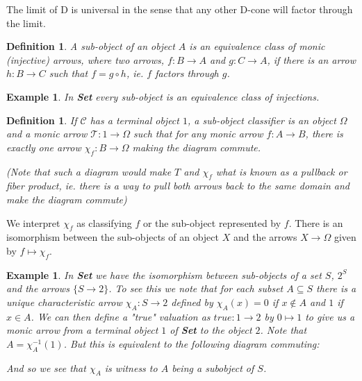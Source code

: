 \documentclass[12pt,a4paper]{article}
\newtheorem{example}[theorem]{Example}
\newtheorem{definition}[theorem]{Definition}
\newcommand\CC{\mathcal{C}}
\newcommand\TT{\mathcal{T}}
\begin{document}
The limit of D is universal in the sense that any other D-cone will factor through the limit.

\begin{definition}
    A \textit{sub-object} of an object $A$ is an equivalence class of monic (injective) arrows, where two arrows, $f:B\to A$ and $g:C\to A$, if there is an arrow $h:B\to C$ such that $f=g\circ h$, ie. $f$ factors through $g$.
\end{definition}

\begin{example}
    In \textbf{Set} every sub-object is an equivalence class of injections.
\end{example}

\begin{definition}
    If $\CC$ has a terminal object $1$, a \textit{sub-object classifier} is an object $\Omega$ and a monic arrow $\TT:1\to\Omega$ such that for any monic arrow $f:A\to B$, there is exactly one arrow $\chi_f:B\to\Omega$ making the diagram commute.
    \begin{center}
    \end{center}
(Note that such a diagram would make $T$ and $\chi_f$ what is known as a \textit{pullback} or \textit{fiber product}, ie. there is a way to pull both arrows back to the same domain and make the diagram commute)
\end{definition}

We interpret $\chi_f$ as classifying $f$ or the sub-object represented by $f$.
There is an isomorphism between the sub-objects of an object $X$ and the arrows $X\to \Omega$ given by $f\mapsto \chi_f$.

\begin{example}
    In \textbf{Set} we have the isomorphism between sub-objects of a set $S$, $2^S$ and the arrows $\{S\to 2\}$.
    To see this we note that for each subset $A\subseteq S$ there is a unique characteristic arrow $\chi_A: S\to 2$ defined by $\chi_A(x)=0$ if $x\not\in A$ and $1$ if $x\in A$.
    We can then define a "true" valuation as $true:1\to 2$ by $0\mapsto 1$ to give us a monic arrow from a terminal object $1$ of \textbf{Set} to the object $2$.
    Note that $A=\chi_A^{-1}(1)$. 
    But this is equivalent to the following diagram commuting:
    \begin{center}
    \end{center}
    And so we see that $\chi_A$ is witness to $A$ being a subobject of $S$.
\end{example}   
\end{document}
